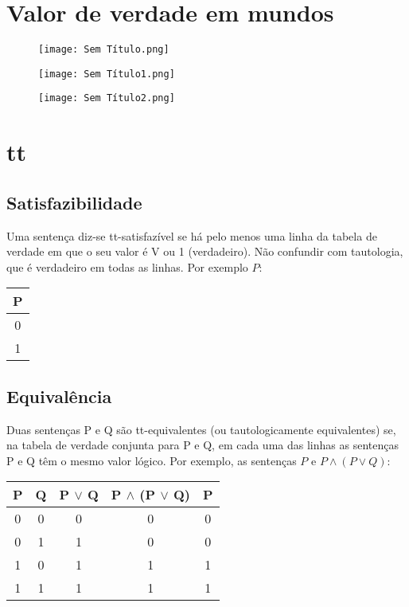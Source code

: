 \documentclass[10pt,a4paper]{report}
\begin{document}
\chapter{Valor de verdade em mundos}
\begin{figure}[h]
\centering
\texttt{[image: Sem Título.png]}
\end{figure}
\begin{figure}[h]
\hspace{-0.8cm}
\texttt{[image: Sem Título1.png]}
\end{figure}
\begin{figure}[h]
\hspace{-0.7cm}
\texttt{[image: Sem Título2.png]}
\end{figure}

\chapter{tt}
\section{Satisfazibilidade}
Uma sentença diz-se tt-satisfazível se há pelo menos uma linha da
tabela de verdade em que o seu valor é V ou 1 (verdadeiro). Não confundir com tautologia, que é verdadeiro em todas as linhas. Por exemplo $P$:
\begin{table}[h]
\centering
\begin{tabular}{c}
P \\ \hline
0 \\
1
\end{tabular}
\end{table}
\section{Equivalência}
Duas sentenças P e Q são tt-equivalentes (ou tautologicamente
equivalentes) se, na tabela de verdade conjunta para P e Q, em cada
uma das linhas as sentenças P e Q têm o mesmo valor lógico.
Por exemplo, as sentenças $P$ e $P \land (P \lor Q)$:
\vspace{0.5cm}
\begin{table}[h]
\centering
\begin{tabular}{c|c|c|c|c}
P & Q & P $\lor$ Q & P $\land$ (P $\lor$ Q) & P \\ \hline
0 & 0 & 0 & 0 & 0 \\
0 & 1 & 1 & 0 & 0 \\
1 & 0 & 1 & 1 & 1 \\
1 & 1 & 1 & 1 & 1
\end{tabular}
\end{table}
\end{document}
